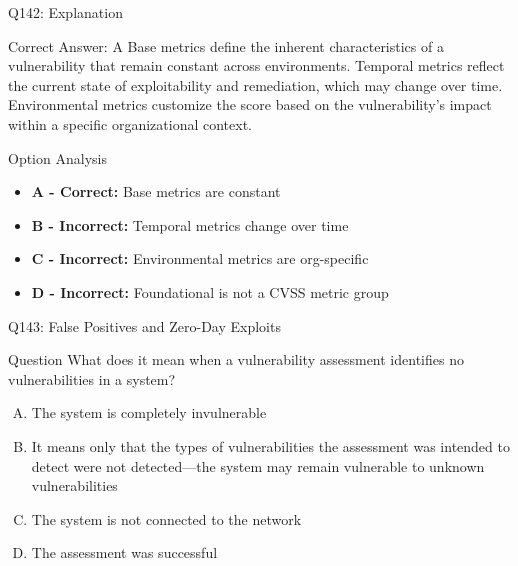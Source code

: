 \documentclass{beamer}
\begin{document}
	\begin{frame}{Q142: Explanation}
		\begin{block}{Correct Answer: A}
			Base metrics define the inherent characteristics of a vulnerability that remain constant across environments. Temporal metrics reflect the current state of exploitability and remediation, which may change over time. Environmental metrics customize the score based on the vulnerability's impact within a specific organizational context.
		\end{block}
		\begin{block}{Option Analysis}
			\begin{itemize}
				\item \textbf{A - Correct:} Base metrics are constant
				\item \textbf{B - Incorrect:} Temporal metrics change over time
				\item \textbf{C - Incorrect:} Environmental metrics are org-specific
				\item \textbf{D - Incorrect:} Foundational is not a CVSS metric group
			\end{itemize}
		\end{block}
	\end{frame}
	
	\begin{frame}{Q143: False Positives and Zero-Day Exploits}
		\begin{block}{Question}
			What does it mean when a vulnerability assessment identifies no vulnerabilities in a system?
		\end{block}
		\begin{enumerate}[(A)]
			\item The system is completely invulnerable
			\item It means only that the types of vulnerabilities the assessment was intended to detect were not detected—the system may remain vulnerable to unknown vulnerabilities
			\item The system is not connected to the network
			\item The assessment was successful
		\end{enumerate}
	\end{frame}
	
\end{document}
